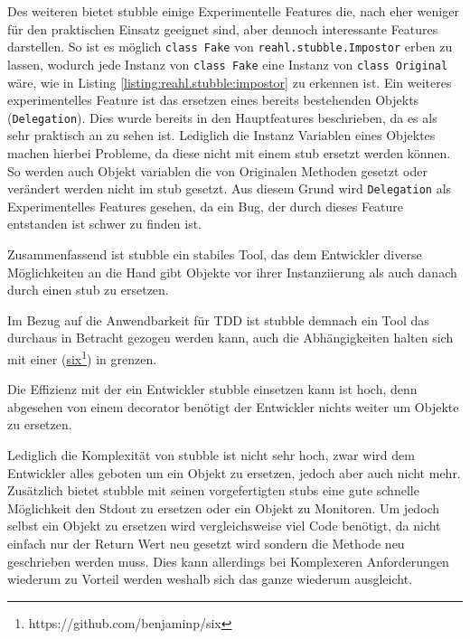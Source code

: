 Des weiteren bietet stubble einige Experimentelle Features die, nach \cite{reahl.stubble:4.0} eher
weniger für den praktischen Einsatz geeignet sind, aber dennoch interessante Features darstellen.
So ist es möglich \lstinline{class Fake} von \lstinline{reahl.stubble.Impostor} erben zu lassen,
wodurch jede Instanz von \lstinline{class Fake} eine Instanz von \lstinline{class Original} wäre,
wie in Listing \ref{listing:reahl.stubble:impostor} zu erkennen ist.
Ein weiteres experimentelles Feature ist das ersetzen eines bereits bestehenden Objekts
(\lstinline{Delegation}). Dies wurde bereits in den Hauptfeatures beschrieben, da es als sehr
praktisch an zu sehen ist. Lediglich die Instanz Variablen eines Objektes machen hierbei Probleme, da
diese nicht mit einem \Gls{stub} ersetzt werden können. So werden auch Objekt variablen die von
Originalen Methoden gesetzt oder verändert werden nicht im \Gls{stub} gesetzt.
Aus diesem Grund wird \lstinline{Delegation} als Experimentelles Features gesehen, da ein Bug, der
durch dieses Feature entstanden ist schwer zu finden ist.

Zusammenfassend ist stubble ein stabiles Tool, das dem Entwickler diverse Möglichkeiten an die Hand
gibt Objekte vor ihrer Instanziierung als auch danach durch einen \Gls{stub} zu ersetzen.

Im Bezug auf die Anwendbarkeit für TDD ist stubble demnach ein Tool das durchaus in Betracht gezogen
werden kann, auch die Abhängigkeiten halten sich mit einer
(\href{https://github.com/benjaminp/six}{six}\footnote{https://github.com/benjaminp/six}) in grenzen.

Die Effizienz mit der ein Entwickler stubble einsetzen kann ist hoch, denn abgesehen von einem
\gls{decorator} benötigt der Entwickler nichts weiter um Objekte zu ersetzen.

Lediglich die Komplexität von stubble ist nicht sehr hoch, zwar wird dem Entwickler alles geboten um
ein Objekt zu ersetzen, jedoch aber auch nicht mehr. Zusätzlich bietet stubble mit seinen
vorgefertigten \Glspl{stub} eine gute schnelle Möglichkeit den Stdout zu ersetzen oder ein Objekt
zu Monitoren. Um jedoch selbst ein Objekt zu ersetzen wird vergleichsweise viel Code benötigt, da
nicht einfach nur der Return Wert neu gesetzt wird sondern die Methode neu geschrieben werden muss.
Dies kann allerdings bei Komplexeren Anforderungen wiederum zu Vorteil werden weshalb sich das ganze
wiederum ausgleicht.

